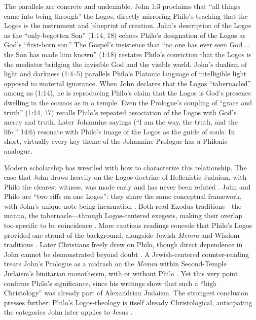The parallels are concrete and undeniable.
John 1:3 proclaims that “all things came into being through” the Logos, directly mirroring Philo’s teaching that the Logos is the instrument and blueprint of creation.
John’s description of the Logos as the “only-begotten Son” (1:14, 18) echoes Philo’s designation of the Logos as God’s “first-born son.”
The Gospel’s insistence that “no one has ever seen God … the Son has made him known” (1:18) restates Philo’s conviction that the Logos is the mediator bridging the invisible God and the visible world.
John’s dualism of light and darkness (1:4--5) parallels Philo’s Platonic language of intelligible light opposed to material ignorance.
When John declares that the Logos “tabernacled” among us (1:14), he is reproducing Philo’s claim that the Logos is God’s presence dwelling in the cosmos as in a temple.
Even the Prologue’s coupling of “grace and truth” (1:14, 17) recalls Philo’s repeated association of the Logos with God’s mercy and truth.
Later Johannine sayings (“I am the way, the truth, and the life,” 14:6) resonate with Philo’s image of the Logos as the guide of souls.
In short, virtually every key theme of the Johannine Prologue has a Philonic analogue.

Modern scholarship has wrestled with how to characterize this relationship.
The case that John draws heavily on the Logos-doctrine of Hellenistic Judaism, with Philo the clearest witness, was made early and has never been refuted \cite{dodd:fourthgospel}.
John and Philo are ``two riffs on one Logos'': they share the same conceptual framework, with John's unique note being incarnation \cite{attridge:essays}.
Both read Exodus traditions---the manna, the tabernacle---through Logos-centered exegesis, making their overlap too specific to be coincidence \cite{borgen:philo}.
More cautious readings concede that Philo's Logos provided one strand of the background, alongside Jewish \emph{Memra} and Wisdom traditions \cite{brown:johannine}.
Later Christians freely drew on Philo, though direct dependence in John cannot be demonstrated beyond doubt \cite{runia:philo}.
A Jewish-centered counter-reading treats John's Prologue as a midrash on the \emph{Memra} within Second-Temple Judaism's binitarian monotheism, with or without Philo \cite{boyarin:jewishgospels}.
Yet this very point confirms Philo's significance, since his writings show that such a ``high Christology'' was already part of Alexandrian Judaism.
The strongest conclusion presses further: Philo's Logos-theology is itself already Christological, anticipating the categories John later applies to Jesus \cite{hillar:logos}.

